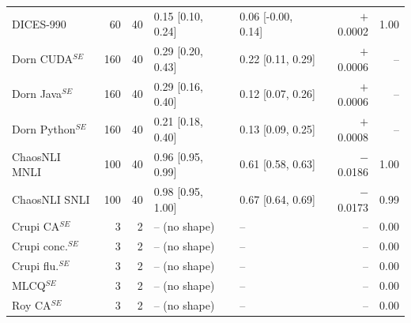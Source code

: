 \begin{table}[t]
\begin{tabular}{lrrllrr}
DICES-990 & 60 & 40 & 0.15 [0.10, 0.24] & 0.06 [-0.00, 0.14] & $+$0.0002 & 1.00 \\
Dorn CUDA$^{SE}$ & 160 & 40 & 0.29 [0.20, 0.43] & 0.22 [0.11, 0.29] & $+$0.0006 & -- \\
Dorn Java$^{SE}$ & 160 & 40 & 0.29 [0.16, 0.40] & 0.12 [0.07, 0.26] & $+$0.0006 & -- \\
Dorn Python$^{SE}$ & 160 & 40 & 0.21 [0.18, 0.40] & 0.13 [0.09, 0.25] & $+$0.0008 & -- \\
ChaosNLI MNLI & 100 & 40 & 0.96 [0.95, 0.99] & 0.61 [0.58, 0.63] & $-$0.0186 & 1.00 \\
ChaosNLI SNLI & 100 & 40 & 0.98 [0.95, 1.00] & 0.67 [0.64, 0.69] & $-$0.0173 & 0.99 \\
Crupi CA$^{SE}$ & 3 & 2 & -- (no shape) & -- & -- & 0.00 \\
Crupi conc.$^{SE}$ & 3 & 2 & -- (no shape) & -- & -- & 0.00 \\
Crupi flu.$^{SE}$ & 3 & 2 & -- (no shape) & -- & -- & 0.00 \\
MLCQ$^{SE}$ & 3 & 2 & -- (no shape) & -- & -- & 0.00 \\
Roy CA$^{SE}$ & 3 & 2 & -- (no shape) & -- & -- & 0.00 \\
\bottomrule\end{tabular}\end{table}